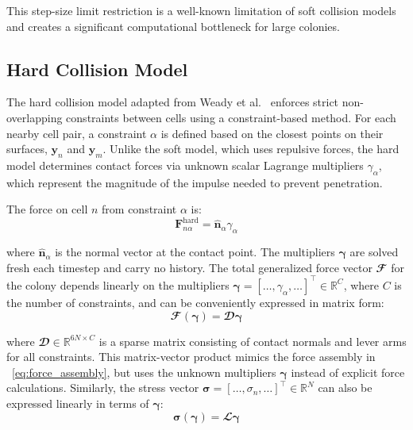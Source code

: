 \documentclass[a4paper,fleqn]{cas-dc}
\begin{document}
This step-size limit restriction is a well-known limitation of soft collision models and creates a significant computational bottleneck for large colonies.

\subsection{Hard Collision Model}

The hard collision model adapted from Weady et al.~\cite{Weady2024SM} enforces strict non-overlapping constraints between cells using a constraint-based method. For each nearby cell pair, a constraint $\alpha$ is defined based on the closest points on their surfaces, $\mathbf{y}_n$ and $\mathbf{y}_m$. Unlike the soft model, which uses repulsive forces, the hard model determines contact forces via unknown scalar Lagrange multipliers $\gamma_\alpha$, which represent the magnitude of the impulse needed to prevent penetration.

The force on cell $n$ from constraint $\alpha$ is:
\begin{equation} \label{eq:constraint_force}
    \mathbf{F}^{\text{hard}}_{n\alpha} = \hat{\mathbf{n}}_\alpha \gamma_\alpha
\end{equation}

where $\hat{\mathbf{n}}_\alpha$ is the normal vector at the contact point. The multipliers $\boldsymbol{\gamma}$ are solved fresh each timestep and carry no history. The total generalized force vector $\mathbfcal{F}$ for the colony depends linearly on the multipliers $\boldsymbol{\gamma} = [\dots, \gamma_\alpha, \dots]^\top \in \mathbb{R}^{C}$, where $C$ is the number of constraints, and can be conveniently expressed in matrix form:
\begin{equation} \label{eq:force_as_function_of_multipliers}
    \mathbfcal{F}(\boldsymbol{\gamma}) = \mathbfcal{D} \boldsymbol{\gamma}
\end{equation}

where $\mathbfcal{D} \in \mathbb{R}^{6N \times C}$ is a sparse matrix consisting of contact normals and lever arms for all constraints. This matrix-vector product mimics the force assembly in ~\autoref{eq:force_assembly}, but uses the unknown multipliers $\boldsymbol{\gamma}$ instead of explicit force calculations. Similarly, the stress vector $\boldsymbol{\sigma} = [\dots, \sigma_n, \dots]^\top \in \mathbb{R}^{N}$ can also be expressed linearly in terms of $\boldsymbol{\gamma}$:
\begin{equation} \label{eq:stress_as_function_of_multipliers}
    \boldsymbol{\sigma}(\boldsymbol{\gamma}) = \mathbfcal{L} \boldsymbol{\gamma}
\end{equation}
\end{document}
